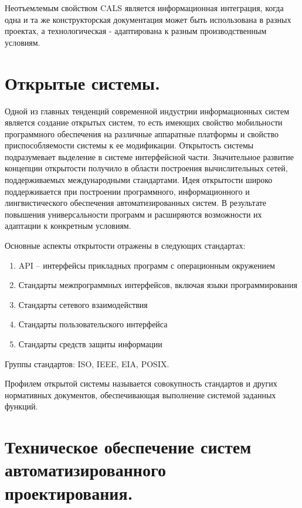 \documentclass[unicode, 12pt, a4paper, oneside]{article}
\begin{document}
Неотъемлемым свойством CALS является информационная интеграция, когда одна и та же конструкторская документация может быть использована в разных проектах, а технологическая - адаптирована к разным производственным условиям.

\section{Открытые системы.}

Одной из главных тенденций современной индустрии информационных систем является создание открытых систем, то есть имеющих свойство мобильности программного обеспечения на различные аппаратные платформы и свойство приспособляемости системы к ее модификации. Открытость системы подразумевает выделение в системе интерфейсной части. Значительное развитие концепции открытости получило в области построения вычислительных сетей, поддерживаемых международными стандартами. Идея открытости широко поддерживается при построении программного, информационного и лингвистического обеспечения автоматизированных систем. В результате повышения универсальности программ и расширяются возможности их адаптации к конкретным условиям.

Основные аспекты открытости отражены в следующих стандартах:

\begin{enumerate}
\item API – интерфейсы прикладных программ с операционным окружением
\item Стандарты межпрограммных интерфейсов, включая языки программирования
\item Стандарты сетевого взаимодействия
\item Стандарты пользовательского интерфейса
\item Стандарты средств защиты информации
\end{enumerate}

Группы стандартов: ISO, IEEE, EIA, POSIX.

Профилем открытой системы называется совокупность стандартов и других нормативных документов, обеспечивающая выполнение системой заданных функций.

\section{Техническое обеспечение систем автоматизированного проектирования.}
\end{document}
